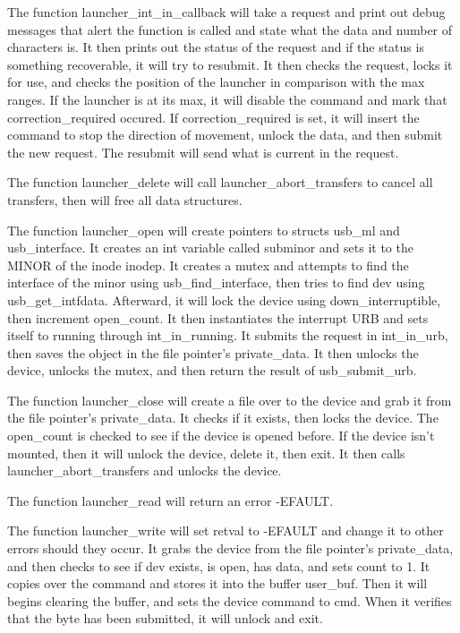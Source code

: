 \documentclass[letterpaper,10pt,titlepage]{article}
\begin{document}
The function launcher\_int\_in\_callback will take a request and print out debug messages that alert the function is called and state what the data and number of characters is. It then prints out the status of the request and if the status is something recoverable, it will try to resubmit. It then checks the request, locks it for use, and checks the position of the launcher in comparison with the max ranges. If the launcher is at its max, it will disable the command and mark that correction\_required occured. If correction\_required is set, it will insert the command to stop the direction of movement, unlock the data, and then submit the new request. The resubmit will send what is current in the request.

The function launcher\_delete will call launcher\_abort\_transfers to cancel all transfers, then will free all data structures.

The function launcher\_open will create pointers to structs usb\_ml and usb\_interface. It creates an int variable called subminor and sets it to the MINOR of the inode inodep. It creates a mutex and attempts to find the interface of the minor using usb\_find\_interface, then tries to find dev using usb\_get\_intfdata. Afterward, it will lock the device using down\_interruptible, then increment open\_count. It then instantiates the interrupt URB and sets itself to running through int\_in\_running. It submits the request in int\_in\_urb, then saves the object in the file pointer's private\_data. It then unlocks the device, unlocks the mutex, and then return the result of usb\_submit\_urb.

The function launcher\_close will create a file over to the device and grab it from the file pointer's private\_data. It checks if it exists, then locks the device. The open\_count is checked to see if the device is opened before. If the device isn't mounted, then it will unlock the device, delete it, then exit. It then calls launcher\_abort\_transfers and unlocks the device.

The function launcher\_read will return an error -EFAULT.

The function launcher\_write will set retval to -EFAULT and change it to other errors should they occur. It grabs the device from the file pointer's private\_data, and then checks to see if dev exists, is open, has data, and sets count to 1. It copies over the command and stores it into the buffer user\_buf. Then it will begins clearing the buffer, and sets the device command to cmd. When it verifies that the byte has been submitted, it will unlock and exit.
\end{document}
